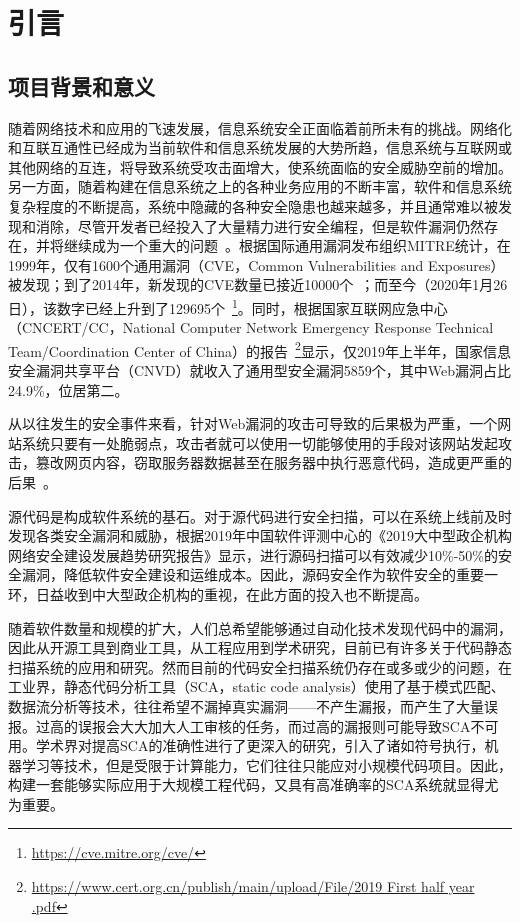 \chapter{引言}

\section{项目背景和意义}
随着网络技术和应用的飞速发展，信息系统安全正面临着前所未有的挑战。网络化和互联互通性已经成为当前软件和信息系统发展的大势所趋，信息系统与互联网或其他网络的互连，将导致系统受攻击面增大，使系统面临的安全威胁空前的增加。另一方面，随着构建在信息系统之上的各种业务应用的不断丰富，软件和信息系统复杂程度的不断提高，系统中隐藏的各种安全隐患也越来越多，并且通常难以被发现和消除，尽管开发者已经投入了大量精力进行安全编程，但是软件漏洞仍然存在，并将继续成为一个重大的问题~\cite{vuldeepecker}。根据国际通用漏洞发布组织MITRE统计，在1999年，仅有1600个通用漏洞（CVE，Common Vulnerabilities and Exposures）被发现；到了2014年，新发现的CVE数量已接近10000个~\cite{liujian2018}；而至今（2020年1月26日），该数字已经上升到了129695个~\footnote{\url{https://cve.mitre.org/cve/}}。同时，根据国家互联网应急中心（CNCERT/CC，National Computer Network Emergency Response Technical Team/Coordination Center of China）的报告~\footnote{\url{https://www.cert.org.cn/publish/main/upload/File/2019 First half year .pdf}}显示，仅2019年上半年，国家信息安全漏洞共享平台（CNVD）就收入了通用型安全漏洞5859个，其中Web漏洞占比24.9\%，位居第二。

从以往发生的安全事件来看，针对Web漏洞的攻击可导致的后果极为严重，一个网站系统只要有一处脆弱点，攻击者就可以使用一切能够使用的手段对该网站发起攻击，篡改网页内容，窃取服务器数据甚至在服务器中执行恶意代码，造成更严重的后果~\cite{WebApplication}。

源代码是构成软件系统的基石。对于源代码进行安全扫描，可以在系统上线前及时发现各类安全漏洞和威胁，根据2019年中国软件评测中心的《2019大中型政企机构网络安全建设发展趋势研究报告》显示，进行源码扫描可以有效减少10\%-50\%的安全漏洞，降低软件安全建设和运维成本。因此，源码安全作为软件安全的重要一环，日益收到中大型政企机构的重视，在此方面的投入也不断提高。

随着软件数量和规模的扩大，人们总希望能够通过自动化技术发现代码中的漏洞，因此从开源工具到商业工具，从工程应用到学术研究，目前已有许多关于代码静态扫描系统的应用和研究。然而目前的代码安全扫描系统仍存在或多或少的问题，在工业界，静态代码分析工具（SCA，static code analysis）使用了基于模式匹配、数据流分析等技术，往往希望不漏掉真实漏洞——不产生漏报，而产生了大量误报。过高的误报会大大加大人工审核的任务，而过高的漏报则可能导致SCA不可用。学术界对提高SCA的准确性进行了更深入的研究，引入了诸如符号执行，机器学习等技术，但是受限于计算能力，它们往往只能应对小规模代码项目。因此，构建一套能够实际应用于大规模工程代码，又具有高准确率的SCA系统就显得尤为重要。

